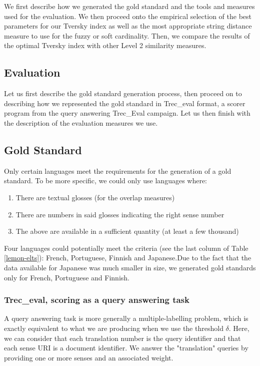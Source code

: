 \documentclass[10pt, a4paper]{article}
\begin{document}
We first describe how we generated the gold standard and the tools and measures used for the evaluation. We then proceed onto the empirical selection of the best parameters for our Tversky index as well as the most appropriate string distance measure to use for the fuzzy or soft cardinality. Then, we compare the results of the optimal Tversky index with other Level 2 similarity measures.
 
\subsection{Evaluation}
Let us first describe the gold standard generation process, then proceed on to describing how we represented the gold standard in Trec\_eval format, a scorer program from the query answering Trec\_Eval campaign. Let us then finish with the description of the evaluation measures we use. 
\subsection{Gold Standard}
Only certain languages meet the requirements for the generation of a gold standard. To be more specific, we could only use languages where:
\begin{enumerate}
	\item There are textual glosses (for the overlap measures)
	\item There are numbers in said glosses indicating the right sense number
	\item The above are available in a sufficient quantity (at least a few thousand)
\end{enumerate}

Four languages could potentially meet the criteria (see the last column of Table \ref{lemon-elts}): French, Portuguese, Finnish and Japanese.Due to the fact that the data available for Japanese was much smaller in size, we generated gold standards only for French, Portuguese and Finnish.

\subsubsection{Trec\_eval, scoring as a query answering task}

A query answering task is more generally a multiple-labelling problem, which is exactly equivalent to what we are producing when we use the threshold \(\delta\). Here, we can consider that each translation number is the query identifier and that each sense URI is a document identifier. We answer the "translation" queries by providing one or more senses and an associated weight.
\end{document}
